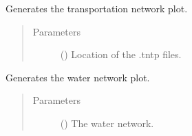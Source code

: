 \documentclass[letterpaper,10pt,english]{sphinxmanual}
\begin{document}

\begin{fulllineitems}
\label{\detokenize{apidoc:dreaminsg_integrated_model.src.plots.plot_transpo_net}}
\sphinxAtStartPar
Generates the transportation network plot.
\begin{quote}\begin{description}
\item[{Parameters}] \leavevmode
\sphinxAtStartPar
{} () \textendash{} Location of the .tntp files.

\end{description}\end{quote}

\end{fulllineitems}


\begin{fulllineitems}
\label{\detokenize{apidoc:dreaminsg_integrated_model.src.plots.plot_water_net}}
\sphinxAtStartPar
Generates the water network plot.
\begin{quote}\begin{description}
\item[{Parameters}] \leavevmode
\sphinxAtStartPar
{} () \textendash{} The water network.

\end{description}\end{quote}

\end{fulllineitems}
\end{document}
